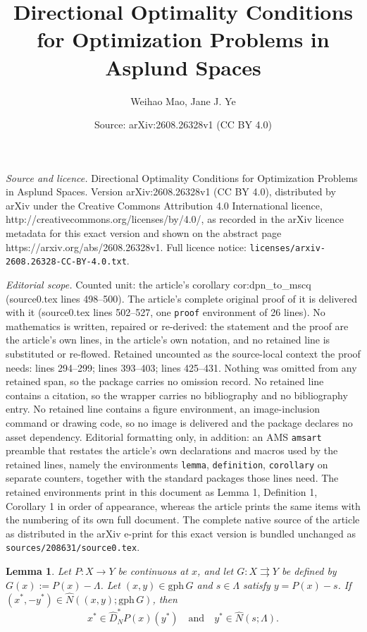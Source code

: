 \documentclass[10pt,a4paper]{amsart}
\title{Directional Optimality Conditions for Optimization Problems in Asplund Spaces}
\author{Weihao Mao, Jane J. Ye}
\date{Source: arXiv:2608.26328v1 (CC BY 4.0)}
\newtheorem{lemma}{Lemma}
\begin{document}
\maketitle

\noindent\emph{Source and licence.} Directional Optimality Conditions for Optimization Problems in Asplund Spaces. Version arXiv:2608.26328v1 (CC BY 4.0), distributed by arXiv under the Creative Commons Attribution 4.0 International licence, http://creativecommons.org/licenses/by/4.0/, as recorded in the arXiv licence metadata for this exact version and shown on the abstract page https://arxiv.org/abs/2608.26328v1. Full licence notice: \texttt{licenses/arxiv-2608.26328-CC-BY-4.0.txt}.\par\smallskip

\noindent\textit{Editorial scope.} Counted unit: the article's corollary cor:dpn\_to\_mscq (source0.tex lines 498--500). The article's complete original proof of it is delivered with it (source0.tex lines 502--527, one \texttt{proof} environment of 26 lines). No mathematics is written, repaired or re-derived: the statement and the proof are the article's own lines, in the article's own notation, and no retained line is substituted or re-flowed.  Retained uncounted as the source-local context the proof needs: lines 294--299; lines 393--403; lines 425--431.  Nothing was omitted from any retained span, so the package carries no omission record.  No retained line contains a citation, so the wrapper carries no bibliography and no bibliography entry.  No retained line contains a figure environment, an image-inclusion command or drawing code, so no image is delivered and the package declares no asset dependency.  Editorial formatting only, in addition: an AMS \texttt{amsart} preamble that restates the article's own declarations and macros used by the retained lines, namely the environments \texttt{lemma}, \texttt{definition}, \texttt{corollary} on separate counters, together with the standard packages those lines need.  The retained environments print in this document as Lemma 1, Definition 1, Corollary 1 in order of appearance, whereas the article prints the same items with the numbering of its own full document.  The complete native source of the article as distributed in the arXiv e-print for this exact version is bundled unchanged as \texttt{sources/208631/source0.tex}.
\begin{lemma} \label{lem:normal_cone_G_representation}
Let $P:X\to Y$ be continuous at $x$, and let $G: X \rightrightarrows Y$ be defined by $G(x) := P(x) - \Lambda$. Let $(x, y) \in \mathrm{gph}\, G$ and $s \in \Lambda$ satisfy $y = P(x) - s$. If $(x^*, -y^*) \in \widehat{N}\left((x, y); \mathrm{gph}\, G\right)$, then
\begin{equation} \label{eq:decoupling_inclusion}
    x^* \in \widehat{D}_N^* P(x)(y^*) \quad \text{and} \quad y^* \in \widehat{N}(s; \Lambda).
\end{equation}
\end{lemma}
\end{document}
